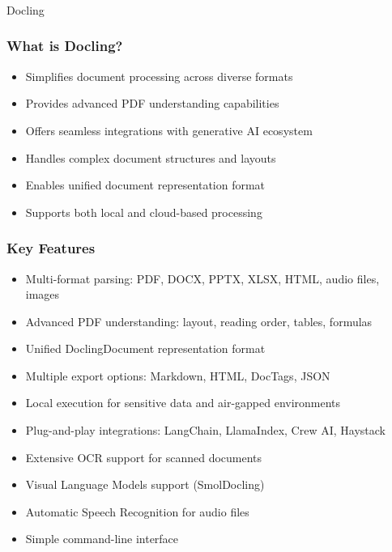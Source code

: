 \begin{frame}[fragile]\frametitle{}
\begin{center}
{\Large Docling}
\end{center}

\end{frame}

\begin{frame}[fragile]\frametitle{What is Docling?}
      \begin{itemize}
	\item Simplifies document processing across diverse formats
	\item Provides advanced PDF understanding capabilities
	\item Offers seamless integrations with generative AI ecosystem
	\item Handles complex document structures and layouts
	\item Enables unified document representation format
	\item Supports both local and cloud-based processing
	  \end{itemize}
\end{frame}

\begin{frame}[fragile]\frametitle{Key Features}
      \begin{itemize}
	\item Multi-format parsing: PDF, DOCX, PPTX, XLSX, HTML, audio files, images
	\item Advanced PDF understanding: layout, reading order, tables, formulas
	\item Unified DoclingDocument representation format
	\item Multiple export options: Markdown, HTML, DocTags, JSON
	\item Local execution for sensitive data and air-gapped environments
	\item Plug-and-play integrations: LangChain, LlamaIndex, Crew AI, Haystack
	\item Extensive OCR support for scanned documents
	\item Visual Language Models support (SmolDocling)
	\item Automatic Speech Recognition for audio files
	\item Simple command-line interface
	  \end{itemize}
\end{frame}

